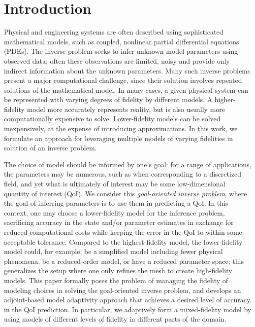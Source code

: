 \section{Introduction}

Physical and engineering systems are often described using sophisticated mathematical models, such as coupled, nonlinear partial differential equations (PDEs). The inverse problem seeks to infer unknown model parameters using observed data; often these observations are limited, noisy and provide only indirect information about the unknown parameters. Many such inverse problems present a major computational challenge, since their solution involves repeated solutions of the mathematical model. In many cases, a given physical system can be represented with varying degrees of fidelity by different models. A higher-fidelity model more accurately represents reality, but is also usually more computationally expensive to solve. Lower-fidelity models can be solved inexpensively, at the expense of introducing approximations. In this work, we formulate an approach for leveraging multiple models of varying fidelities in solution of an inverse problem.

The choice of model should be informed by one's goal: for a range of applications, the parameters may be numerous, such as when corresponding to a discretized field, and yet what is ultimately of interest may be some low-dimensional quantity of interest (QoI). We consider this \textit{goal-oriented inverse problem}, where the goal of inferring parameters is to use them in predicting a QoI. In this context, one may choose a lower-fidelity model for the inference problem, sacrificing accuracy in the state and/or parameter estimates in exchange for reduced computational costs while keeping the error in the QoI to within some acceptable tolerance. Compared to the highest-fidelity model, the lower-fidelity model could, for example, be a simplified model including fewer physical phenomena, be a reduced-order model, or have a reduced parameter space; this generalizes the setup where one only refines the mesh to create high-fidelity models. This paper formally poses the problem of managing the fidelity of modeling choices in solving the goal-oriented inverse problem, and develops an adjoint-based model adaptivity approach that achieves a desired level of accuracy in the QoI prediction. In particular, we adaptively form a mixed-fidelity model by using models of different levels of fidelity in different parts of the domain. %

